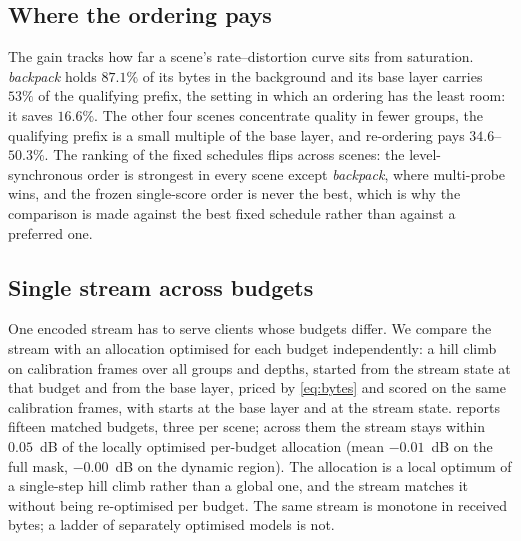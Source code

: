 \documentclass[lettersize,journal]{IEEEtran}
\begin{document}
\subsection{Where the ordering pays}
The gain tracks how far a scene's rate--distortion curve sits from saturation.
\emph{backpack} holds $87.1\%$ of its bytes in the background and its base
layer carries $53\%$ of the qualifying prefix, the setting in which an ordering
has the least room: it saves $16.6\%$. The other four scenes
concentrate quality in fewer groups, the qualifying prefix is a small multiple of
the base layer, and re-ordering pays $34.6$--$50.3\%$. The ranking of the fixed
schedules flips across scenes: the level-synchronous order is strongest in
every scene except \emph{backpack}, where multi-probe wins, and the frozen
single-score order is never the best, which is why the comparison
is made against the best fixed schedule rather than against a preferred one.

\subsection{Single stream across budgets}
One encoded stream has to serve clients whose budgets differ. We compare the
stream with an allocation optimised for each budget independently: a hill climb
on calibration frames over all groups and depths, started from the stream state
at that budget and from the base layer, priced by \eqref{eq:bytes} and scored on
the same calibration frames, with starts at the base layer and at the stream
state.  reports fifteen matched budgets, three per scene;
across them the stream stays within $0.05$~dB of the locally optimised
per-budget allocation (mean
$-0.01$~dB on the full mask, $-0.00$~dB on the dynamic region). The allocation is a local optimum of a single-step hill
climb rather than a global one, and the stream matches it without being
re-optimised per budget. The same stream is monotone in received bytes; a ladder
of separately optimised models is not.
\end{document}
